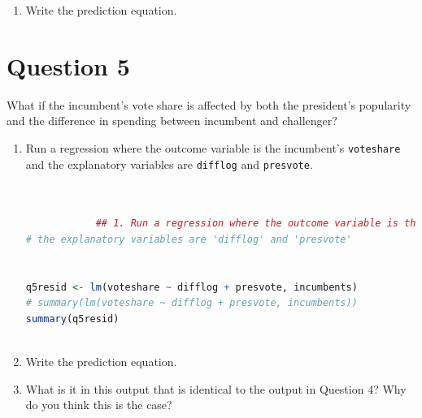 \documentclass[12pt,letterpaper]{article}
\begin{document}
\begin{enumerate}
		
		\item Write the prediction equation.
	\end{enumerate}
	
	\newpage	

\section*{Question 5}%
\noindent What if the incumbent's vote share is affected by both the president's popularity and the difference in spending between incumbent and challenger? 
	\begin{enumerate}
		\item Run a regression where the outcome variable is the incumbent's \texttt{voteshare} and the explanatory variables are \texttt{difflog} and \texttt{presvote}.	\vspace{5cm}
		
			\begin{lstlisting}[language=R]
			
			
			## 1. Run a regression where the outcome variable is the incumbent's 'voteshare' and 
# the explanatory variables are 'difflog' and 'presvote'


q5resid <- lm(voteshare ~ difflog + presvote, incumbents)
# summary(lm(voteshare ~ difflog + presvote, incumbents))
summary(q5resid)
			
		\end{lstlisting}
		
		\item Write the prediction equation.	\vspace{5cm}
		\item What is it in this output that is identical to the output in Question 4? Why do you think this is the case?%
	\end{enumerate}
\end{document}
